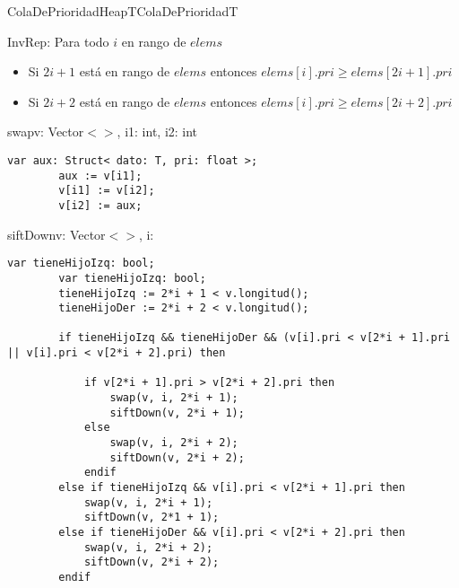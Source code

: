 \begin{module}{ColaDePrioridadHeap}{T}{ColaDePrioridad}{T}

	InvRep: Para todo $i$ en rango de $elems$
	\begin{itemize}
		\item Si $2i + 1$ está en rango de $elems$ entonces $elems[i].pri \geq elems[2i + 1].pri$
		\item Si $2i + 2$ está en rango de $elems$ entonces $elems[i].pri \geq elems[2i + 2].pri$
	\end{itemize}


	\begin{proc}{swap}{\Inout v: Vector$<$$>$, \In i1: int, \In i2: int}{}
		\begin{lstlisting}[numbers=none,frame=none]
		var aux: Struct< dato: T, pri: float >;
		aux := v[i1];
		v[i1] := v[i2];
		v[i2] := aux;
		\end{lstlisting}
	\end{proc}

	\begin{proc}{siftDown}{\Inout v: Vector$<$$>$, \In i: \Int}{}
		\begin{lstlisting}[numbers=none,frame=none]
		var tieneHijoIzq: bool;
		var tieneHijoIzq: bool;
		tieneHijoIzq := 2*i + 1 < v.longitud();
		tieneHijoDer := 2*i + 2 < v.longitud();

		if tieneHijoIzq && tieneHijoDer && (v[i].pri < v[2*i + 1].pri || v[i].pri < v[2*i + 2].pri) then

			if v[2*i + 1].pri > v[2*i + 2].pri then
				swap(v, i, 2*i + 1);
				siftDown(v, 2*i + 1);
			else
				swap(v, i, 2*i + 2);
				siftDown(v, 2*i + 2);
			endif
		else if tieneHijoIzq && v[i].pri < v[2*i + 1].pri then
			swap(v, i, 2*i + 1);
			siftDown(v, 2*1 + 1);
		else if tieneHijoDer && v[i].pri < v[2*i + 2].pri then
			swap(v, i, 2*i + 2);
			siftDown(v, 2*i + 2);
		endif
		\end{lstlisting}
	\end{proc}


\end{module}

